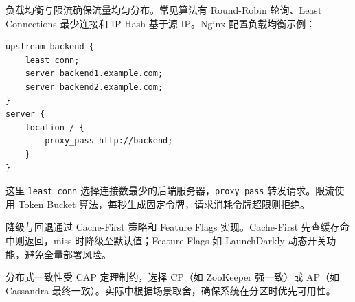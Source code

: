 负载均衡与限流确保流量均匀分布。常见算法有 Round-Robin 轮询、Least Connections 最少连接和 IP Hash 基于源 IP。Nginx 配置负载均衡示例：\par
\begin{lstlisting}
upstream backend {
    least_conn;
    server backend1.example.com;
    server backend2.example.com;
}
server {
    location / {
        proxy_pass http://backend;
    }
}
\end{lstlisting}
这里 \texttt{least\_{}conn} 选择连接数最少的后端服务器，\texttt{proxy\_{}pass} 转发请求。限流使用 Token Bucket 算法，每秒生成固定令牌，请求消耗令牌超限则拒绝。\par
降级与回退通过 Cache-First 策略和 Feature Flags 实现。Cache-First 先查缓存命中则返回，miss 时降级至默认值；Feature Flags 如 LaunchDarkly 动态开关功能，避免全量部署风险。\par
分布式一致性受 CAP 定理制约，选择 CP（如 ZooKeeper 强一致）或 AP（如 Cassandra 最终一致）。实际中根据场景取舍，确保系统在分区时优先可用性。\par
